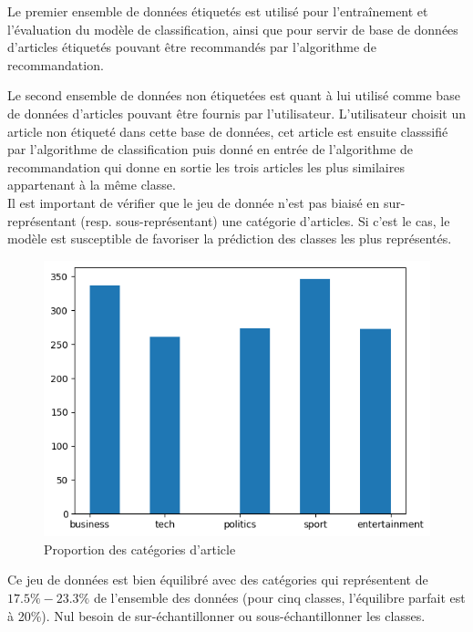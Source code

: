 \documentclass[a4paper,12pt]{article}
\begin{document}
Le premier ensemble de données étiquetés est utilisé pour l'entraînement et l'évaluation du modèle de classification, ainsi que pour servir de base de données d'articles étiquetés pouvant être recommandés par l'algorithme de recommandation.

Le second ensemble de données non étiquetées est quant à lui utilisé comme base de données d'articles pouvant être fournis par l'utilisateur. L'utilisateur choisit un article non étiqueté dans cette base de données, cet article est ensuite classsifié par l'algorithme de classification puis donné en entrée de l'algorithme de recommandation qui donne en sortie les trois articles les plus similaires appartenant à la même classe.\\

Il est important de vérifier que le jeu de donnée n'est pas biaisé en sur-représentant (resp. sous-représentant) une catégorie d'articles. Si c'est le cas, le modèle est susceptible de favoriser la prédiction des classes les plus représentés.

\begin{figure}[H]
  \centering
  \includegraphics{./images/class_balanced.png} %
  \caption{Proportion des catégories d'article}
  \label{fig:classBalance}
\end{figure}

Ce jeu de données est bien équilibré avec des catégories qui représentent de $17.5 \%-23.3\%$ de l'ensemble des données (pour cinq classes, l'équilibre parfait est à 20\%). Nul besoin de sur-échantillonner ou sous-échantillonner les classes.\\
\end{document}
